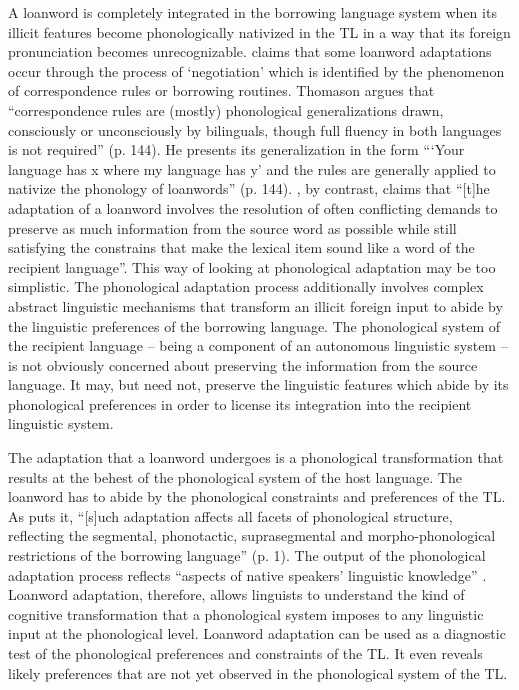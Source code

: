 \documentclass[output=paper]{langscibook}
\begin{document}
A loanword is completely integrated in the borrowing language system when its illicit features become phonologically nativized in the TL in a way that its foreign pronunciation becomes unrecognizable. \citet[144]{thomason2001language} claims that some loanword adaptations  occur through the process of ‘negotiation’ which is identified by the phenomenon of correspondence rules or borrowing routines. Thomason argues that “correspondence rules are (mostly) phonological generalizations drawn, consciously or unconsciously by bilinguals, though full fluency in both languages is not required” (p. 144). He presents its generalization in the form “‘Your language has x where my language has y’ and the rules are generally applied to nativize the phonology of loanwords” (p. 144). \citet[139]{kenstowicz2006salience}, by contrast, claims that “[t]he adaptation of a loanword involves the resolution of often conflicting demands to preserve as much information from the source word as possible while still satisfying the constrains that make the lexical item sound like a word of the recipient language”. This way of looking at phonological adaptation may be too simplistic. The phonological adaptation process additionally involves complex abstract linguistic mechanisms that transform an illicit foreign input to abide by the linguistic preferences of the borrowing language. The phonological system of the recipient language – being a component of an autonomous linguistic system – is not obviously concerned about preserving the information from the source language. It may, but need not, preserve the linguistic features which abide by its phonological preferences in order to license its integration into the recipient linguistic system.

The adaptation that a loanword undergoes is a phonological transformation that results at the behest of the phonological system of the host language. The loanword has to abide by the phonological constraints and preferences of the TL. As \citet{kang2011loanword} puts it, “[s]uch adaptation affects all facets of phonological structure, reflecting the segmental, phonotactic, suprasegmental and morpho-phonological restrictions of the borrowing language” (p. 1). The output of the phonological adaptation process reflects “aspects of native speakers' linguistic knowledge” \citep[1]{kang2011loanword}. Loanword adaptation, therefore, allows linguists to understand the kind of cognitive transformation that a phonological system imposes to any linguistic input at the phonological level. Loanword adaptation can be used as a diagnostic test of the phonological preferences and constraints of the TL. It even reveals likely preferences that are not yet observed in the phonological system of the TL.
\end{document}
